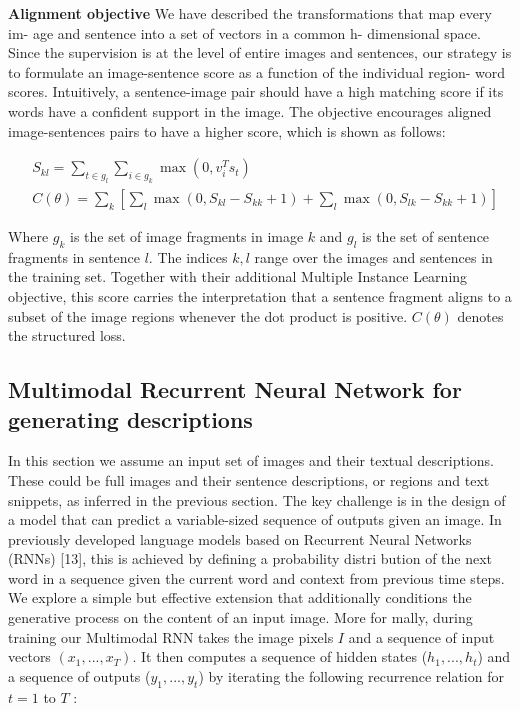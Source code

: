 \documentclass[12pt]{article}%
\begin{document}
{\bf Alignment objective} We have described the transformations that map every im- age and sentence into a set of vectors in a common h- dimensional space. Since the supervision is at the level of entire images and sentences, our strategy is to formulate an image-sentence score as a function of the individual region- word scores. Intuitively, a sentence-image pair should have a high matching score if its words have a confident support in the image. The objective encourages aligned image-sentences pairs to have a higher score, which is shown as follows:

\begin{align}
  & {{S}_{kl}}=\sum\limits_{t\in {{g}_{l}}}{\sum\limits_{i\in {{g}_{k}}}{\max (0,v_{i}^{T}{{s}_{t}})}} \\ 
 & C(\theta )=\sum\limits_{k}{[\sum\limits_{l}{\max (0,{{S}_{kl}}-{{S}_{kk}}+1)+\sum\limits_{l}{\max (0,{{S}_{lk}}-{{S}_{kk}}+1)}}]}  
\end{align}

Where $g_k$  is the set of image fragments in image $k$  and $g_l$  is the set of sentence fragments in sentence $l$. The indices $k, l$ range over the images and sentences in the training set. Together with their additional Multiple Instance Learning objective, this score carries the interpretation that a sentence fragment aligns to a subset of the image regions whenever the dot product is positive. $C(\theta )$ denotes the structured loss. 



\subsection{Multimodal Recurrent Neural Network for generating descriptions}

In this section we assume an input set of images and their textual descriptions. These could be full images and their sentence descriptions, or regions and text snippets, as inferred in the previous section. The key challenge is in the design of a model that can predict a variable-sized sequence of outputs given an image. In previously developed language models based on Recurrent Neural Networks (RNNs) [13], this is achieved by defining a probability distri bution of the next word in a sequence given the current word and context from previous time steps. We explore a simple but effective extension that additionally conditions the generative process on the content of an input image. More for mally, during training our Multimodal RNN takes the image pixels $I$ and a sequence of input vectors $(x_1, . . . , x_T )$. It then computes a sequence of hidden states ($h_1, . . . , h_t$) and a sequence of outputs ($y_1, . . . , y_t$) by iterating the following recurrence relation for $t = 1$ to $T$ : 
\end{document}

